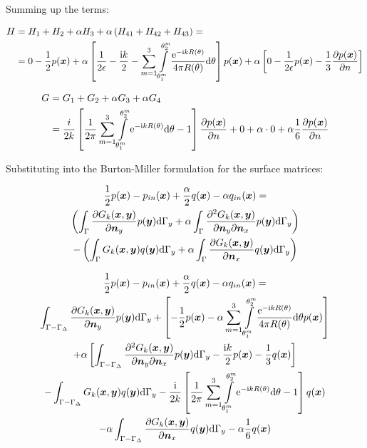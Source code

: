 \documentclass[a4paper, 10pt]{article}
\newcommand{\te}{\mathrm{e}}
\newcommand{\ti}{\mathrm{i}}
\newcommand{\td}{\mathrm{d}}
\newcommand{\sx}{\bm{\mathnormal{x}}}
\newcommand{\sy}{\bm{\mathnormal{y}}}
\newcommand{\sn}{\bm{\mathnormal{n}}}
\newcommand{\summ}{\sum\limits_{m=1}^3}
\newcommand{\intms}{\int\limits_{\theta_1^m}^{\theta_2^m}}
\begin{document}
Summing up the terms:

\begin{align}
	H & = H_1 + H_2 + \alpha H_3 + \alpha \left(H_{41} + H_{42} + H_{43}\right) = \nonumber \\ 
	&= 0 - \frac{1}{2} p(\sx) + \alpha \left[\frac{1}{2\epsilon} - \frac{\ti k}{2}- \summ \intms \frac{\te ^{-\ti k R(\theta)}}{4 \pi R(\theta)} \mathrm{d} \theta\right] p(\sx) + \alpha \left[0 - \frac{1}{2\epsilon} p(\sx) - \frac{1}{3} \frac{\partial{p(\sx)}}{\partial n}\right]
\end{align}

\begin{align}
	G & = G_1 + G_2 + \alpha G_3 + \alpha G_4 \nonumber \\
	& = \frac{i}{2k}\left[\frac{1}{2\pi}\summ \intms \te ^{-\ti kR(\theta)} \mathrm{d} \theta -1 \right]\frac{\partial p(\sx)}{\partial n} + 0 + \alpha \cdot 0 + \alpha \frac{1}{6} \frac{\partial p(\sx)}{\partial n}
\end{align}

Substituting into the Burton-Miller formulation for the surface matrices:

\begin{multline}
	\frac{1}{2} p (\sx)
	-
	p_{in}(\sx)
	+
	\frac{\alpha}{2} q(\sx)
	-
	\alpha q_{in}(\sx)
	= \\
	\left(
	\int_{\Gamma} \frac{\partial{G}_k (\sx, \sy)}{\partial \sn_y} p(\sy) \td \Gamma_y
	+
	\alpha \int_{\Gamma}
	\frac{\partial^2{G}_k (\sx, \sy)}{\partial \sn_y \partial \sn_x} p(\sy) \td \Gamma_y
	\right)
	\\
	-
	\left(
	\int_{\Gamma} G_k(\sx,\sy) q(\sy) \td \Gamma_y
	+
	\alpha \int_{\Gamma}
	\frac{\partial G_k(\sx,\sy)}{\partial \sn_x}q(\sy) \td \Gamma_y
	\right)
\end{multline}

\begin{multline}
	\frac{1}{2} p (\sx)
	-
	p_{in}(\sx)
	+
	\frac{\alpha}{2} q(\sx)
	-
	\alpha q_{in}(\sx)
	= \\
	\int_{\Gamma-\Gamma_\Delta} \frac{\partial{G}_k (\sx, \sy)}{\partial \sn_y} p(\sy) \td \Gamma_y
	+
	\left[-\frac{1}{2}p(\sx) - \alpha \summ \intms \frac{\te ^{-\ti k R(\theta)}}{4 \pi R(\theta)} \mathrm{d} \theta p(\sx)\right] 
	\\ + 
	\alpha \left[\int_{\Gamma-\Gamma_\Delta}
	\frac{\partial^2{G}_k (\sx, \sy)}{\partial \sn_y \partial \sn_x} p(\sy) \td \Gamma_y
	- \frac{\ti k}{2} p(\sx) - \frac{1}{3}q(\sx)\right]
	\\
	-
	\int_{\Gamma-\Gamma_\Delta} G_k(\sx,\sy) q(\sy) \td \Gamma_y
	-
	\frac{\ti}{2k}\left[\frac{1}{2\pi}\summ \intms \te ^{-\ti kR(\theta)} \mathrm{d} \theta -1 \right] q(\sx)
	\\
	-
	\alpha \int_{\Gamma-\Gamma_\Delta}
	\frac{\partial G_k(\sx,\sy)}{\partial \sn_x}q(\sy) \td \Gamma_y
	- \alpha \frac{1}{6}q(\sx)
\end{multline}
\end{document}
